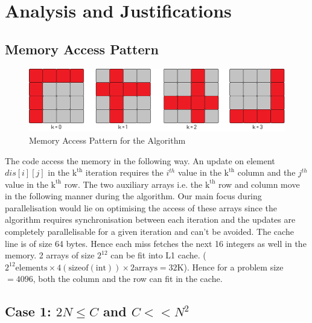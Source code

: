 \documentclass{article}
\begin{document}
\section{Analysis and Justifications}
\subsection{Memory Access Pattern}
\begin{figure}[!h]
    \centering
    \includegraphics[scale=0.23]{memAccessPattern.png}
    \caption{Memory Access Pattern for the Algorithm}
\end{figure}

The code access the memory in the following way. An update on element $dis[i][j]$ in the $\mathrm{k}^{\mathrm{th}}$ iteration requires the $i^{th}$ value in the $\mathrm{k}^{\mathrm{th}}$ column and the $j^{th}$ value in the $\mathrm{k}^{\mathrm{th}}$ row. The two auxiliary arrays i.e. the $\mathrm{k}^{\mathrm{th}}$ row and column move in the following manner during the algorithm. 
Our main focus during parallelisation would lie on optimising the access of these arrays since the algorithm requires synchronisation between each iteration and the updates are completely parallelisable for a given iteration and can't be avoided. The cache line is of size 64 bytes. Hence each miss fetches the next 16 integers as well in the memory.
2 arrays of size $2^{12}$ can be fit into L1 cache. ($2^{12} \mathrm{elements} \times 4 \mathrm{(sizeof(int))} \times 2 \mathrm{arrays} = 32$K). Hence for a problem size $=4096$, both the column and the row can fit in the cache.

\subsection{Case 1: $2N \leq C$ and $C << N^2$}
\end{document}
